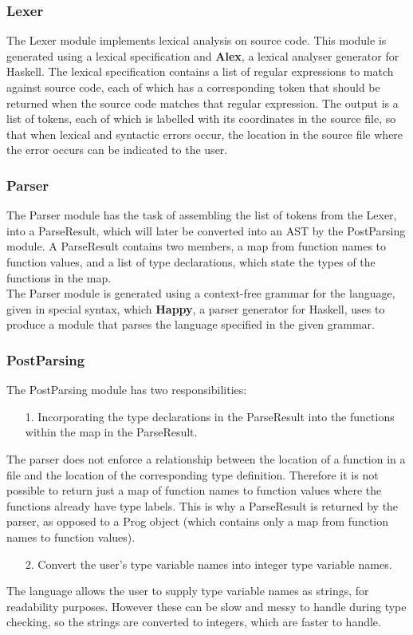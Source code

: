 \documentclass{article}
\begin{document}
\subsubsection{Lexer}
The Lexer module implements lexical analysis on source code. This module is generated using a lexical specification and \textbf{Alex}, a lexical analyser generator for Haskell. The lexical specification contains a list of regular expressions to match against source code, each of which has a corresponding token that should be returned when the source code matches that regular expression. The output is a list of tokens, each of which is labelled with its coordinates in the source file, so that when lexical and syntactic errors occur, the location in the source file where the error occurs can be indicated to the user.
\subsubsection{Parser}
The Parser module has the task of assembling the list of tokens from the Lexer, into a ParseResult, which will later be converted into an AST by the PostParsing module. A ParseResult contains two members, a map from function names to function values, and a list of type declarations, which state the types of the functions in the map.
\\\indent The Parser module is generated using a context-free grammar for the language, given in special syntax, which \textbf{Happy}, a parser generator for Haskell, uses to produce a module that parses the language specified in the given grammar.
\subsubsection{PostParsing}
The PostParsing module has two responsibilities:
\begin{enumerate}
    \item[1.] Incorporating the type declarations in the ParseResult into the functions within the map in the ParseResult.
\end{enumerate}
        \indent The parser does not enforce a relationship between the location of a function in a file and the location of the corresponding type definition. Therefore it is not possible to return just a map of function names to function values where the functions already have type labels. This is why a ParseResult is returned by the parser, as opposed to a Prog object (which contains only a map from function names to function values).
\begin{enumerate}
    \item[2.] Convert the user's type variable names into integer type variable names.
\end{enumerate}
        \indent The language allows the user to supply type variable names as strings, for readability purposes. However these can be slow and messy to handle during type checking, so the strings are converted to integers, which are faster to handle.
\end{document}
